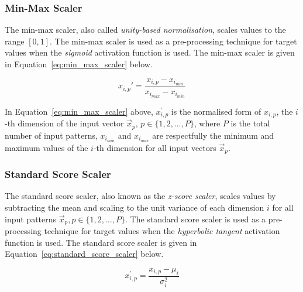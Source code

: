 \subsubsection{Min-Max Scaler}\label{sec:anns:an:input:min_max_scaler}

The min-max scaler, also called \textit{unity-based normalisation}, scales values to the range $[0,1]$. The min-max scaler is used as a pre-processing technique for target values when the \textit{sigmoid}  activation function is used. The min-max scaler is given in Equation~\eqref{eq:min_max_scaler} below.

\begin{equation}
      x_{i,p}'  = \frac{x_{i,p} - x_{i_{min}}}{x_{i_{max}} - x_{i_{min}}}
      \label{eq:min_max_scaler}
\end{equation}

\noindent
In Equation~\eqref{eq:min_max_scaler} above, $x_{i,p}^{'}$ is the normalised form of $x_{i,p}$, the $i$-th dimension of the input vector $\vec{x}_p$, $p \in \{1,2, \dots, P \}$, where $P$ is the total number of input patterns, $x_{i_{min}}$ and $x_{i_{max}}$ are respectfully the minimum and maximum values of the $i$-th dimension for all input vectors $\vec{x}_p$.

\subsubsection{Standard Score Scaler}\label{sec:anns:an:input:standard_score_scaler}

The standard score scaler, also known as the \textit{z-score scaler}, scales values by subtracting the mean and scaling to the unit variance of each dimension $i$ for all input patterns $\vec{x}_p, p \in \{1,2, \dots, P\}$. The standard score scaler is used as a pre-processing technique for target values when the \textit{hyperbolic tangent} activation function is used. The standard score scaler is given in Equation~\eqref{eq:standard_score_scaler} below.

\begin{equation}
      x_{i,p}^{'} = \frac{x_{i,p} - \mu_i}{\sigma^2_i}
      \label{eq:standard_score_scaler}
\end{equation}

